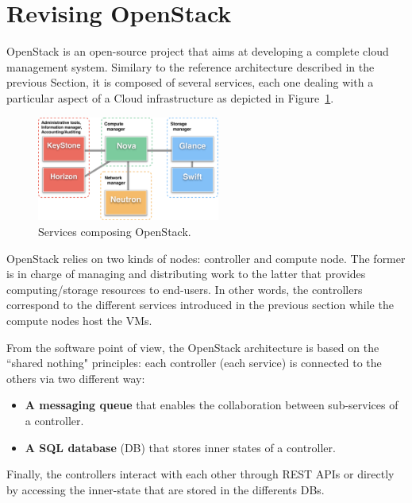 \section{Revising OpenStack}
\label{sec:leveraging-openstack}

OpenStack is an open-source project that aims at developing a complete cloud management
system. Similary to the reference architecture described in the previous Section, it is
composed of several services, each one dealing with a particular
aspect of a Cloud infrastructure as depicted in Figure~\ref{fig:openstack}.

\begin{figure}[htbp]
        \centering
        \includegraphics[width=6cm]{figures/OpenStack_architecture.pdf}
\vspace*{-.3cm}
        \caption{Services composing OpenStack.}
        \label{fig:openstack}
\vspace*{-.3cm}
\end{figure}


OpenStack relies on two kinds
of nodes: controller and compute node. The former is in charge of managing and
distributing work to the latter that provides computing/storage resources to end-users. In
other words, the controllers correspond to the different services introduced in the
previous section while the compute nodes host the VMs.

From the software point of view, the OpenStack architecture is based on the ``shared
nothing" principles: each controller (\ie each service) is connected to the others via two
different way:

\begin{itemize}
   \setlength{\itemsep}{0pt}
  \setlength{\parskip}{0pt}
   \setlength{\parsep}{0pt}
\item \textbf{A messaging queue} that enables the collaboration between sub-services of a
  controller.
\item \textbf{A SQL database} (DB) that stores inner states of a controller.
\end{itemize}

Finally, the controllers interact with each other through REST APIs or directly by accessing
the inner-state that are stored in the differents DBs.

